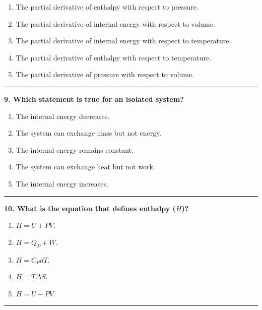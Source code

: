 \documentclass[
  9pt,
]{extbook}
\providecommand{\tightlist}{%
  \setlength{\itemsep}{0pt}\setlength{\parskip}{0pt}}
\theoremstyle{definition}
\theoremstyle{definition}
\theoremstyle{definition}
\theoremstyle{definition}
\theoremstyle{remark}
\begin{document}
\begin{enumerate}
\def\labelenumi{\alph{enumi}.}
\tightlist
\item
  The partial derivative of enthalpy with respect to pressure.
\item
  The partial derivative of internal energy with respect to volume.
\item
  The partial derivative of internal energy with respect to temperature.
\item
  The partial derivative of enthalpy with respect to temperature.
\item
  The partial derivative of pressure with respect to volume.
\end{enumerate}

\begin{center}\rule{0.5\linewidth}{0.5pt}\end{center}

\textbf{9. Which statement is true for an isolated system?}

\begin{enumerate}
\def\labelenumi{\alph{enumi}.}
\tightlist
\item
  The internal energy decreases.
\item
  The system can exchange mass but not energy.
\item
  The internal energy remains constant.
\item
  The system can exchange heat but not work.
\item
  The internal energy increases.
\end{enumerate}

\begin{center}\rule{0.5\linewidth}{0.5pt}\end{center}

\textbf{10. What is the equation that defines enthalpy (\(H\))?}

\begin{enumerate}
\def\labelenumi{\alph{enumi}.}
\tightlist
\item
  \(H = U + PV\).
\item
  \(H = Q_P + W\).
\item
  \(H = C_P dT\).
\item
  \(H = T \Delta S\).
\item
  \(H = U - PV\).
\end{enumerate}

\begin{center}\rule{0.5\linewidth}{0.5pt}\end{center}
\end{document}
